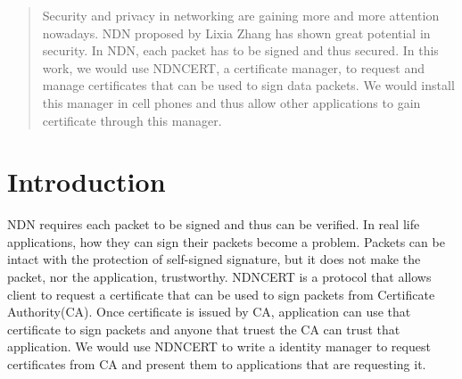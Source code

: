 \documentclass[a0,portrait]{poster}
\begin{document}
\begin{multicols}{2} %


\color{Navy} %

\begin{abstract}

Security and privacy in networking are gaining more and more attention nowadays. NDN proposed by Lixia Zhang has shown great potential in security. In NDN, each packet has to be signed and thus secured. In this work, we would use NDNCERT, a certificate manager, to request and manage certificates that can be used to sign data packets. We would install this manager in cell phones and thus allow other applications to gain certificate through this manager. 

\end{abstract}


\color{SaddleBrown} %

\section*{Introduction}
NDN requires each packet to be signed and thus can be verified. In real life applications, how they can sign their packets become a problem. Packets can be intact with the protection of self-signed signature, but it does not make the packet, nor the application, trustworthy. NDNCERT is a protocol that allows client to request a certificate that can be used to sign packets from Certificate Authority(CA). Once certificate is issued by CA, application can use that certificate to sign packets and anyone that truest the CA can trust that application. We would use NDNCERT to write a identity manager to request certificates from CA and present them to applications that are requesting it.



\end{multicols}
\end{document}
